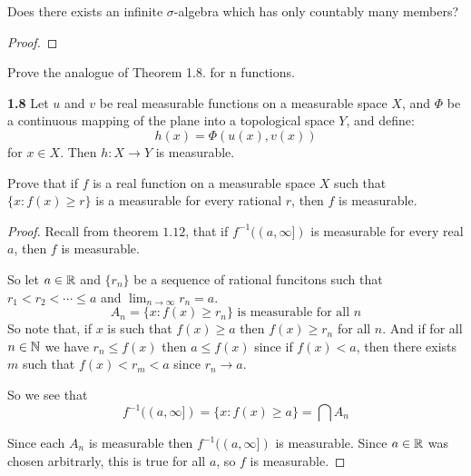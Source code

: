 


    \begin{exercise}
        Does there exists an infinite $\sigma$-algebra which has only countably many members?
    \begin{proof}
        
    \end{proof}
    \end{exercise}

    \begin{exercise}
        Prove the analogue of Theorem 1.8. for n functions.
        
        \begin{theorem}\textbf{1.8}
            Let $u$ and $v$ be real measurable functions on a measurable space $X$, and $\Phi$ be a continuous mapping of the plane into a topological space $Y$, and define:\begin{equation*}
                h(x) = \Phi(u(x),v(x))
            \end{equation*}
            for $x\in X$. Then $h\colon X\rightarrow Y$ is measurable.
        \end{theorem}
    \end{exercise}

    \begin{exercise}
        Prove that if $f$ is a real function on a measurable space $X$ such that $\{x\colon f(x)\geq r\}$ is a measurable for every rational $r$, then $f$ is measurable.
    
        \begin{proof}
            Recall from theorem $1.12$, that if $f^{-1}((a,\infty])$ is measurable for every real $a$, then $f$ is measurable.

            So let $a\in \mathbb{R}$ and $\{r_n\}$ be a sequence of rational funcitons such that $r_1<r_2<\cdots\leq a$ and $\lim_{n\rightarrow\infty} r_n = a$. \[A_n = \{x\colon f(x)\geq r_n\} \text{ is measurable for all } n\] So note that, if $x$ is such that $f(x)\geq a$ then $f(x)\geq r_n$ for all $n$. 
            And if for all $n\in\mathbb{N}$ we have $r_n\leq f(x)$ then $a\leq f(x)$ since if $f(x)<a$, then there exists $m$ such that $f(x)<r_m<a$ since $r_n\rightarrow a$.
        
        So we see that \begin{equation}
            f^{-1}((a,\infty]) = \{x\colon f(x)\geq a\} = \bigcap A_n
        \end{equation}

        Since each $A_n$ is measurable then $f^{-1}((a,\infty])$ is measurable. Since $a\in \mathbb{R}$ was chosen arbitrarly, this is true for all $a$, so $f$ is measurable.
        \end{proof}
    \end{exercise}

